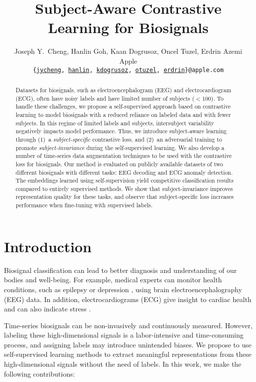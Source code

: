 \documentclass{article}
\title{Subject-Aware Contrastive Learning for Biosignals}
\author{Joseph Y.~Cheng, Hanlin Goh, Kaan Dogrusoz, Oncel Tuzel, Erdrin Azemi \\
  Apple \\
  \texttt{\{\href{mailto:jycheng@apple.com}{jycheng},\,\href{mailto:hanlin@apple.com}{hanlin},\,\href{mailto:kdogrusoz@apple.com}{kdogrusoz},\,\href{mailto:otuzel@apple.com}{otuzel},\,\href{mailto:erdrin@apple.com}{erdrin}\}@apple.com}
}
\begin{document}
\maketitle



\begin{abstract}
Datasets for biosignals, such as electroencephalogram (EEG) and electrocardiogram (ECG), often have noisy labels and have limited number of subjects ($<$100). To handle these challenges, we propose a self-supervised approach based on contrastive learning to model biosignals with a reduced reliance on labeled data and with fewer subjects. In this regime of limited labels and subjects, intersubject variability negatively impacts model performance. Thus, we introduce subject-aware learning through (1)~a \textit{subject-specific} contrastive loss, and (2)~an adversarial training to promote \textit{subject-invariance} during the self-supervised learning. We also develop a number of time-series data augmentation techniques to be used with the contrastive loss for biosignals. Our method is evaluated on publicly available datasets of two different biosignals with different tasks: EEG decoding and ECG anomaly detection. The embeddings learned using self-supervision yield competitive classification results compared to entirely supervised methods. We show that subject-invariance improves representation quality for these tasks, and observe that subject-specific loss increases performance when fine-tuning with supervised labels.

\end{abstract} 

\section{Introduction}

Biosignal classification can lead to better diagnosis and understanding of our
bodies and well-being. For example, medical experts can monitor health
conditions, such as epilepsy \cite{acharya_automated_2013} or depression
\cite{de_aguiar_neto_depression_2019}, using brain electroencephalography (EEG)
data. In addition, electrocardiograms (ECG) give insight to cardiac health and
can also indicate stress \cite{healey_detecting_2005}.

Time-series biosignals can be non-invasively and continuously measured. However,
labeling these high-dimensional signals is a labor-intensive and time-consuming
process, and assigning labels may introduce unintended biases. We propose to use
self-supervised learning methods to extract meaningful representations from
these high-dimensional signals without the need of labels. In this work, we make the following contributions:
\end{document}
